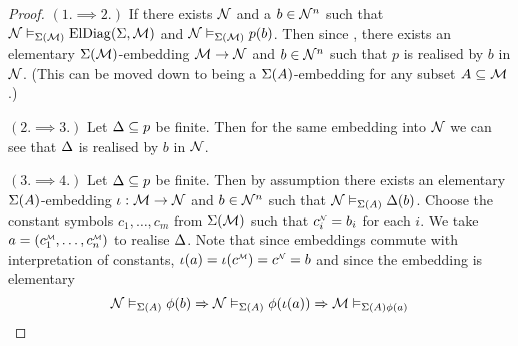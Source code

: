 \begin{proof}
    $(1. \implies 2.)$ If there exists $\mathcal{N}$ and a
    $b \in {\mathcal{N}}^n$ such that 
    $\mathcal{N} \vDash_{\Sigma(\mathcal{M})} \mathrm{ElDiag}(\Sigma,\mathcal{M})$ and 
    $\mathcal{N} \vDash_{\Sigma(\mathcal{M})} p(b)$.
    Then since , 
    there exists an elementary $\Sigma(\mathcal{M})$-embedding $\mathcal{M} \to \mathcal{N}$ 
    and $b \in {\mathcal{N}}^n$ such that $p$ 
    is realised by $b$ in $\mathcal{N}$.
    (This can be moved down to being a $\Sigma(A)$-embedding for any 
    subset $A \subseteq \mathcal{M}$.)

    $(2. \implies 3.)$ Let $\Delta \subseteq p$ be finite.
    Then for the same embedding into $\mathcal{N}$ we can see that $\Delta$ 
    is realised by $b$ in $\mathcal{N}$.

    $(3. \implies 4.)$ Let $\Delta \subseteq p$ be finite.
    Then by assumption there exists an elementary $\Sigma(A)$-embedding 
    $\iota : \mathcal{M} \to \mathcal{N}$ and $b \in {\mathcal{N}}^n$ 
    such that  
    $\mathcal{N} \vDash_{\Sigma(A)} \Delta(b)$.
    Choose the constant symbols $c_1,\dots,c_m$ from $\Sigma(\mathcal{M})$ such that
    $\modintp{\NN}{c_i} = b_i$ for each $i$.
    We take $a = (\mmintp{c_1},\dots,\mmintp{c_n})$ to realise $\Delta$.
    Note that since embeddings commute with interpretation of constants,
    $\io(a) = \io(\mmintp{c}) = \nnintp{c} = b$ and since the 
    embedding is elementary 
    \[\mathcal{N} \vDash_{\Sigma(A)} \phi(b) 
    \Rightarrow \mathcal{N} \vDash_{\Sigma(A)} \phi(\iota(a)) 
    \Rightarrow \mathcal{M} \vDash_{\Sigma(A) \phi(a)}\]

%


\end{proof}
